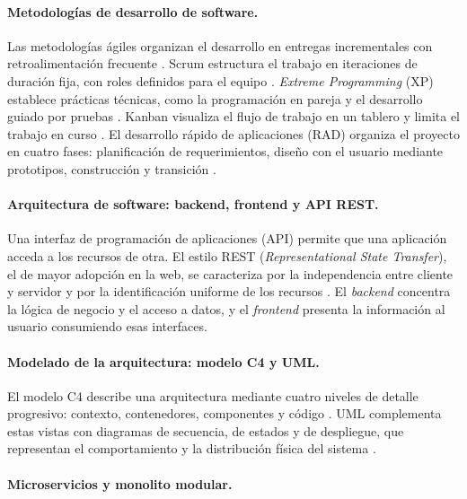 \paragraph{Metodologías de desarrollo de software.}

Las metodologías ágiles organizan el desarrollo en entregas incrementales con
retroalimentación frecuente \cite{sommerville2016software}. Scrum estructura el
trabajo en iteraciones de duración fija, con roles definidos para el equipo
\cite{schwaber2020scrum}. \textit{Extreme Programming} (XP) establece prácticas
técnicas, como la programación en pareja y el desarrollo guiado por pruebas
\cite{beck2004extreme}. Kanban visualiza el flujo de trabajo en un tablero y
limita el trabajo en curso \cite{anderson2010kanban}. El desarrollo rápido de
aplicaciones (RAD) organiza el proyecto en cuatro fases: planificación de
requerimientos, diseño con el usuario mediante prototipos, construcción y
transición \cite{martin1991rapid}.

\paragraph{Arquitectura de software: backend, frontend y API REST.}

Una interfaz de programación de aplicaciones (API) permite que una aplicación acceda
a los recursos de otra. El estilo REST (\textit{Representational State Transfer}), el
de mayor adopción en la web, se caracteriza por la independencia entre cliente y
servidor y por la identificación uniforme de los recursos \cite{ibm2024restapi}. El
\textit{backend} concentra la lógica de negocio y el acceso a datos, y el
\textit{frontend} presenta la información al usuario consumiendo esas interfaces.

\paragraph{Modelado de la arquitectura: modelo C4 y UML.}

El modelo C4 describe una arquitectura mediante cuatro niveles de detalle
progresivo: contexto, contenedores, componentes y código \cite{brown2018c4}. UML
complementa estas vistas con diagramas de secuencia, de estados y de despliegue,
que representan el comportamiento y la distribución física del sistema
\cite{omg2017uml}.

\paragraph{Microservicios y monolito modular.}

